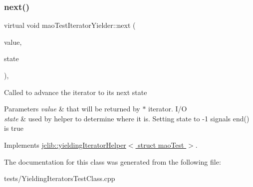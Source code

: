 \subsubsection{\texorpdfstring{next()}{next()}}
{\footnotesize\ttfamily virtual void mao\+Test\+Iterator\+Yielder\+::next (\begin{DoxyParamCaption}\item[{struct \hyperlink{structmaoTest}{mao\+Test} \&}]{value,  }\item[{int \&}]{state }\end{DoxyParamCaption})\hspace{0.3cm}{\ttfamily [inline]}, {\ttfamily [virtual]}}

Called to advance the iterator to its next state 
\begin{DoxyParams}{Parameters}
{\em value} & that will be returned by $\ast$ iterator. I/O \\
\hline
{\em state} & used by helper to determine where it is. Setting state to -\/1 signals end() is true \\
\hline
\end{DoxyParams}


Implements \hyperlink{classjclib_1_1yieldingIteratorHelper_a620c17e7eb8ed695e3fb9add01da576d}{jclib\+::yielding\+Iterator\+Helper$<$ struct mao\+Test $>$}.



The documentation for this class was generated from the following file\+:\begin{DoxyCompactItemize}
\item 
tests/Yielding\+Iterators\+Test\+Class.\+cpp\end{DoxyCompactItemize}
